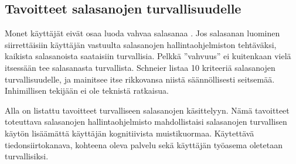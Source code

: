 \documentclass{tktltiki}
\begin{document}
\subsection{Tavoitteet salasanojen turvallisuudelle}

Monet käyttäjät eivät osaa luoda vahvaa salasanaa \cite{generating_and_remembering_pws_04, password_management_strategies_06}. Jos salasanan luominen siirrettäisiin käyttäjän vastuulta salasanojen hallintaohjelmiston tehtäväksi, kaikista salasanoista saataisiin turvallisia. Pelkkä ''vahvuus'' ei kuitenkaan vielä itsessään tee salasanasta turvallista. 
Schneier \cite{schneier_password_advice_09} listaa 10 kriteeriä salasanojen turvallisuudelle, ja mainitsee itse rikkovansa niistä säännöllisesti seitsemää. Inhimillisen tekijään ei ole teknistä ratkaisua.

Alla on listattu tavoitteet turvalliseen salasanojen käsittelyyn. Nämä tavoitteet toteuttava salasanojen hallintaohjelmisto mahdollistaisi salasanojen turvallisen käytön lisäämättä käyttäjän kognitiivista muistikuormaa. Käytettävä tiedonsiirtokanava, kohteena oleva palvelu sekä käyttäjän työasema oletetaan turvallisiksi.
\end{document}
